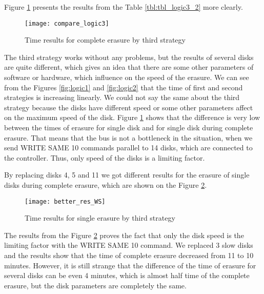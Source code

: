 \newpage
Figure \ref{fig:compare_logic3} presents the results from the Table \ref{tbl:tbl_logic3_2} more clearly.
\begin{figure}[h!]
\begin{center}
  \texttt{[image: compare\_logic3]}
\end{center}
  \caption{Time results for complete erasure by third strategy}
  \label{fig:compare_logic3}
\end{figure}

The third strategy works without any problems, but the results of several disks are quite different, which gives an idea that there are some other parameters of software or hardware, which influence on the speed of the erasure. We can see from the Figures \ref{fig:logic1} and \ref{fig:logic2} that the time of first and second strategies is increasing linearly. We could not say the same about the third strategy because the disks have different speed or some other parameters affect on the maximum speed of the disk. Figure \ref{fig:compare_logic3} shows that the difference is very low between the times of erasure for single disk and for single disk during complete erasure. That means that the bus is not a bottleneck in the situation, when we send WRITE SAME 10 commands parallel to 14 disks, which are connected to the controller. Thus, only speed of the disks is a limiting factor.


By replacing disks 4, 5 and 11 we got different results for the erasure of single disks during complete erasure, which are shown on the Figure \ref{fig:better_res_WS}.
\begin{figure}[h!]
\begin{center}
  \texttt{[image: better\_res\_WS]}
\end{center}
  \caption{Time results for single erasure by third strategy}
  \label{fig:better_res_WS}
\end{figure}

The results from the Figure \ref{fig:better_res_WS} proves the fact that only the disk speed is the limiting factor with the WRITE SAME 10 command. We replaced 3 slow disks and the results show that the time of complete erasure decreased from 11 to 10 minutes. However, it is still strange that the difference of the time of erasure for several disks can be even 4 minutes, which is almost half time of the complete erasure, but the disk parameters are completely the same.



\newpage
